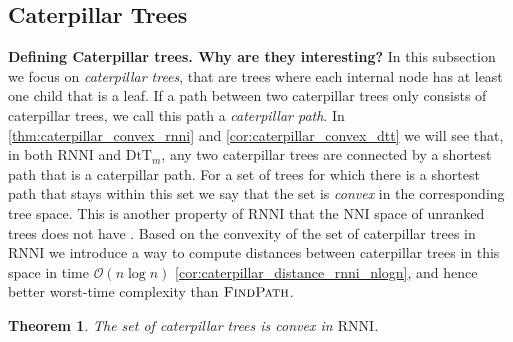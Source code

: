 \documentclass[11pt]{amsart}
\newtheorem{theorem}{Theorem}
\newcommand{\rnni}{\mathrm{RNNI}}
\newcommand{\findpath}{\textsc{FindPath}}
\newcommand{\nni}{\mathrm{NNI}}
\newcommand{\dtt}{\mathrm{DtT}}
\renewcommand{\O}{\mathcal O}
\newcommand{\summary}[1]{\textbf{#1}} %
\begin{document}
\subsection{Caterpillar Trees}

\summary{Defining Caterpillar trees. Why are they interesting?}
In this subsection we focus on \emph{caterpillar trees}, that are trees where each internal node has at least one child that is a leaf.
If a path between two caterpillar trees only consists of caterpillar trees, we call this path a \emph{caterpillar path}.
In \autoref{thm:caterpillar_convex_rnni} and \autoref{cor:caterpillar_convex_dtt} we will see that, in both $\rnni$ and $\dtt_m$, any two caterpillar trees are connected by a shortest path that is a caterpillar path.
For a set of trees for which there is a shortest path that stays within this set we say that the set is \emph{convex} in the corresponding tree space.
This is another property of $\rnni$ that the $\nni$ space of unranked trees does not have \autocite{Gavryushkin2018-ol}.
Based on the convexity of the set of caterpillar trees in $\rnni$ we introduce a way to compute distances between caterpillar trees in this space in time $\O(n\log n)$ \autoref{cor:caterpillar_distance_rnni_nlogn}, and hence better worst-time complexity than $\findpath$.

\begin{theorem}
	The set of caterpillar trees is convex in $\rnni$.
	\label{thm:caterpillar_convex_rnni}
\end{theorem}
\end{document}
